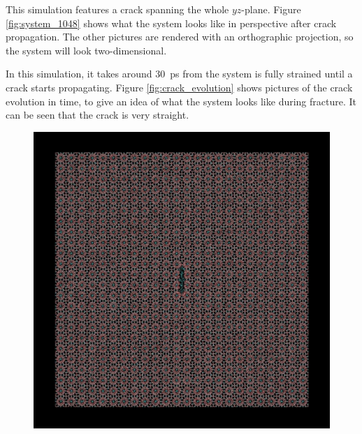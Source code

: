 This simulation features a crack spanning the whole $yz$-plane. Figure \ref{fig:system_1048} shows what the system looks like in perspective after crack propagation. The other pictures are rendered with an orthographic projection, so the system will look two-dimensional. 

In this simulation, it takes around \SI{30}{\pico\second} from the system is fully strained until a crack starts propagating. Figure \ref{fig:crack_evolution} shows pictures of the crack evolution in time, to give an idea of what the system looks like during fracture. It can be seen that the crack is very straight.

\begin{figure}
\begin{minipage}[b]{0.5\linewidth}
\includegraphics[width=\textwidth]{../snapshots/c_1.pdf}
\end{minipage}
\begin{minipage}[b]{0.5\linewidth}

\end{minipage}
\end{figure}
